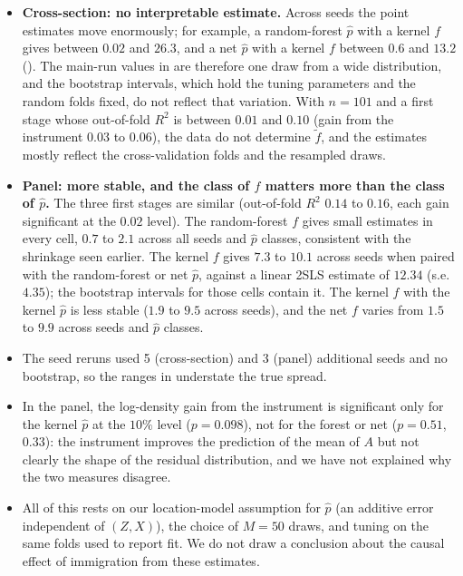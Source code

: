 \begin{itemize}
    \item \textbf{Cross-section: no interpretable estimate.} Across seeds the point estimates move enormously; for example, a random-forest \(\hat p\) with a kernel \(f\) gives between \(0.02\) and \(26.3\), and a net \(\hat p\) with a kernel \(f\) between \(0.6\) and \(13.2\) (). The main-run values in  are therefore one draw from a wide distribution, and the bootstrap intervals, which hold the tuning parameters and the random folds fixed, do not reflect that variation. With \(n = 101\) and a first stage whose out-of-fold \(R^2\) is between \(0.01\) and \(0.10\) (gain from the instrument \(0.03\) to \(0.06\)), the data do not determine \(\tilde f\), and the estimates mostly reflect the cross-validation folds and the resampled draws.
    \item \textbf{Panel: more stable, and the class of \(f\) matters more than the class of \(\hat p\).} The three first stages are similar (out-of-fold \(R^2\) \(0.14\) to \(0.16\), each gain significant at the \(0.02\) level). The random-forest \(f\) gives small estimates in every cell, \(0.7\) to \(2.1\) across all seeds and \(\hat p\) classes, consistent with the shrinkage seen earlier. The kernel \(f\) gives \(7.3\) to \(10.1\) across seeds when paired with the random-forest or net \(\hat p\), against a linear 2SLS estimate of \(12.34\) (s.e.\ \(4.35\)); the bootstrap intervals for those cells contain it. The kernel \(f\) with the kernel \(\hat p\) is less stable (\(1.9\) to \(9.5\) across seeds), and the net \(f\) varies from \(1.5\) to \(9.9\) across seeds and \(\hat p\) classes.
    \item The seed reruns used 5 (cross-section) and 3 (panel) additional seeds and no bootstrap, so the ranges in  understate the true spread.
    \item In the panel, the log-density gain from the instrument is significant only for the kernel \(\hat p\) at the \(10\%\) level (\(p = 0.098\)), not for the forest or net (\(p = 0.51\), \(0.33\)): the instrument improves the prediction of the mean of \(A\) but not clearly the shape of the residual distribution, and we have not explained why the two measures disagree.
    \item All of this rests on our location-model assumption for \(\hat p\) (an additive error independent of \((Z, X)\)), the choice of \(M = 50\) draws, and tuning on the same folds used to report fit. We do not draw a conclusion about the causal effect of immigration from these estimates.
\end{itemize}
